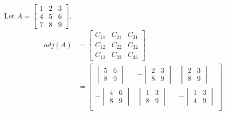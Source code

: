 \documentclass[../main.tex]{subfiles}
\begin{document}
\begin{example} \label{ex:4_8}
  Let \(A = 
  \begin{bmatrix}
    1 & 2 & 3\\
    4 & 5 & 6\\
    7 & 8 & 9
  \end{bmatrix}\).
  \begin{equation*}
    \begin{aligned}
      adj(A) &= 
      \begin{bmatrix}
        C_{11} & C_{21} & C_{31}\\
        C_{12} & C_{22} & C_{32}\\
        C_{13} & C_{23} & C_{33}
      \end{bmatrix}\\
      &=\begin{bmatrix}
          \begin{vmatrix}
            5 & 6\\
            8 & 9
          \end{vmatrix}
          &-\begin{vmatrix}
            2 & 3\\
            8 & 9
          \end{vmatrix}
          &\begin{vmatrix}
            2 & 3\\
            8 & 9
          \end{vmatrix}\\
          
          -\begin{vmatrix}
            4 & 6\\
            8 & 9
          \end{vmatrix}
          &\begin{vmatrix}
            1 & 3\\
            8 & 9
          \end{vmatrix}
          &-\begin{vmatrix}
            1 & 3\\
            4 & 9
          \end{vmatrix}\\
          

\end{bmatrix}
\end{aligned}
\end{equation*}
\end{example}
\end{document}
